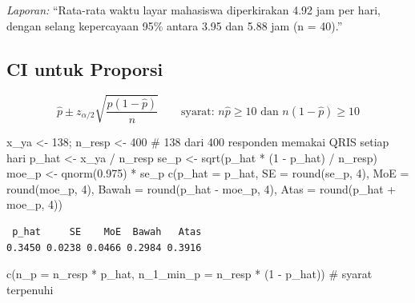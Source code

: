 \documentclass[
  indonesian,
  letterpaper,
]{book}
\newenvironment{Shaded}{\begin{snugshade}}{\end{snugshade}}
\newcommand{\AttributeTok}[1]{\textcolor[rgb]{0.40,0.45,0.13}{#1}}
\newcommand{\CommentTok}[1]{\textcolor[rgb]{0.37,0.37,0.37}{#1}}
\newcommand{\DecValTok}[1]{\textcolor[rgb]{0.68,0.00,0.00}{#1}}
\newcommand{\FloatTok}[1]{\textcolor[rgb]{0.68,0.00,0.00}{#1}}
\newcommand{\FunctionTok}[1]{\textcolor[rgb]{0.28,0.35,0.67}{#1}}
\newcommand{\NormalTok}[1]{\textcolor[rgb]{0.00,0.23,0.31}{#1}}
\newcommand{\OtherTok}[1]{\textcolor[rgb]{0.00,0.23,0.31}{#1}}
\newcommand{\SpecialCharTok}[1]{\textcolor[rgb]{0.37,0.37,0.37}{#1}}
\begin{document}
\emph{Laporan:} ``Rata-rata waktu layar mahasiswa diperkirakan 4.92 jam
per hari, dengan selang kepercayaan 95\% antara 3.95 dan 5.88 jam (n =
40).''

\subsection{CI untuk Proporsi}\label{ci-untuk-proporsi}

\[\widehat{p} \pm z_{\alpha/2}\sqrt{\frac{\widehat{p}(1 - \widehat{p})}{n}} \qquad \text{syarat: } n\widehat{p} \geq 10 \text{ dan } n(1 - \widehat{p}) \geq 10\]

\begin{Shaded}
\begin{Highlighting}[]
\NormalTok{x\_ya }\OtherTok{\textless{}{-}} \DecValTok{138}\NormalTok{; n\_resp }\OtherTok{\textless{}{-}} \DecValTok{400} \CommentTok{\# 138 dari 400 responden memakai QRIS setiap hari}
\NormalTok{p\_hat }\OtherTok{\textless{}{-}}\NormalTok{ x\_ya }\SpecialCharTok{/}\NormalTok{ n\_resp}
\NormalTok{se\_p }\OtherTok{\textless{}{-}} \FunctionTok{sqrt}\NormalTok{(p\_hat }\SpecialCharTok{*}\NormalTok{ (}\DecValTok{1} \SpecialCharTok{{-}}\NormalTok{ p\_hat) }\SpecialCharTok{/}\NormalTok{ n\_resp)}
\NormalTok{moe\_p }\OtherTok{\textless{}{-}} \FunctionTok{qnorm}\NormalTok{(}\FloatTok{0.975}\NormalTok{) }\SpecialCharTok{*}\NormalTok{ se\_p}
\FunctionTok{c}\NormalTok{(}\AttributeTok{p\_hat =}\NormalTok{ p\_hat, }\AttributeTok{SE =} \FunctionTok{round}\NormalTok{(se\_p, }\DecValTok{4}\NormalTok{), }\AttributeTok{MoE =} \FunctionTok{round}\NormalTok{(moe\_p, }\DecValTok{4}\NormalTok{),}
\AttributeTok{Bawah =} \FunctionTok{round}\NormalTok{(p\_hat }\SpecialCharTok{{-}}\NormalTok{ moe\_p, }\DecValTok{4}\NormalTok{), }\AttributeTok{Atas =} \FunctionTok{round}\NormalTok{(p\_hat }\SpecialCharTok{+}\NormalTok{ moe\_p, }\DecValTok{4}\NormalTok{))}
\end{Highlighting}
\end{Shaded}

\begin{verbatim}
 p_hat     SE    MoE  Bawah   Atas 
0.3450 0.0238 0.0466 0.2984 0.3916 
\end{verbatim}

\begin{Shaded}
\begin{Highlighting}[]
\FunctionTok{c}\NormalTok{(}\AttributeTok{n\_p =}\NormalTok{ n\_resp }\SpecialCharTok{*}\NormalTok{ p\_hat, }\AttributeTok{n\_1\_min\_p =}\NormalTok{ n\_resp }\SpecialCharTok{*}\NormalTok{ (}\DecValTok{1} \SpecialCharTok{{-}}\NormalTok{ p\_hat)) }\CommentTok{\# syarat terpenuhi}
\end{Highlighting}
\end{Shaded}
\end{document}
